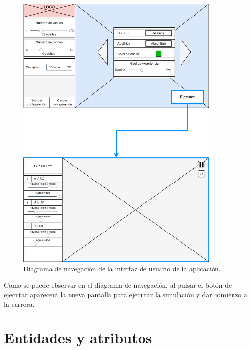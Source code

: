 \begin{figure}[H]
    \centering
    \includegraphics[width=0.9\textwidth]{imagenes/nav.png}
    \caption{Diagrama de navegación de la interfaz de usuario de la aplicación.}
\end{figure}

Como se puede observar en el diagrama de navegación, al pulsar el botón de ejecutar aparecerá la nueva pantalla para ejecutar la simulación y dar comienzo a la carrera.


\section{Entidades y atributos}

